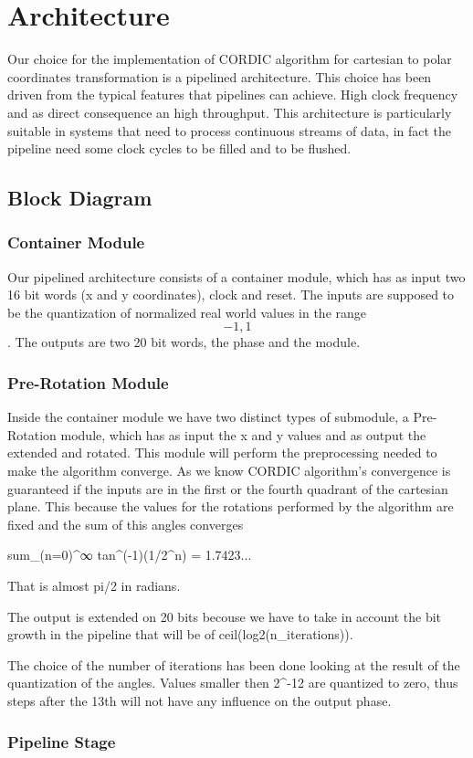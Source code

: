 \section{Architecture}
Our choice for the implementation of CORDIC algorithm for cartesian to polar
coordinates transformation is a pipelined architecture. This choice has been
driven from the typical features that pipelines can achieve. High clock
frequency and as direct consequence an high throughput. This architecture is
particularly suitable in systems that need to process continuous streams of
data, in fact the pipeline need some clock cycles to be filled and to be
flushed.

\subsection{Block Diagram}
\subsubsection{Container Module}
Our pipelined architecture consists of a container module, which has as input
two 16 bit words (x and y coordinates), clock and reset. The inputs are supposed 
to be the quantization of normalized real world values in the range \[-1, 1\]. 
The outputs are two 20 bit words, the phase and the module.

\subsubsection{Pre-Rotation Module}
Inside the container module we have two distinct types of submodule, a
Pre-Rotation module, which has as input the x and y values and as output the
extended and rotated. This module will perform the preprocessing needed to make
the algorithm converge. As we know CORDIC algorithm's convergence is guaranteed
if the inputs are in the first or the fourth quadrant of the cartesian plane.
This because the values for the rotations performed by the algorithm are fixed
and the sum of this angles converges

sum_(n=0)^∞ tan^(-1)(1/2^n) = 1.7423...

That is almost  pi/2 in radians.

The output is extended on 20 bits becouse we have to take in account the bit
growth in the pipeline that will be of ceil(log2(n_iterations)).

The choice of the number of iterations has been done looking at the result of
the quantization of the angles. Values smaller then 2^-12 are quantized to zero,
thus steps after the 13th  will not have any influence on the output phase.

\subsubsection{Pipeline Stage}







